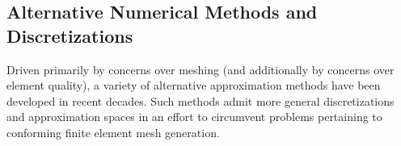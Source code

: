 		
	
	\subsection*{Alternative Numerical Methods and Discretizations}
		Driven primarily by concerns over meshing (and additionally by concerns over element quality), a variety of alternative approximation methods have been developed in recent decades. Such methods admit more general discretizations and approximation spaces in an effort to circumvent problems pertaining to conforming finite element mesh generation.
		
		
		
